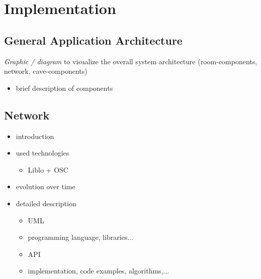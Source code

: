 \documentclass[conference]{acmsiggraph}
\begin{document}
\section{Implementation}





\subsection{General Application Architecture}
\textit{Graphic / diagram} to visualize the overall system architecture (room-components, network, cave-components)
\begin{itemize}
\item brief description of components
\end{itemize}





\subsection{Network}
\begin{itemize}
\item introduction
\item{
	used technologies
	\begin{itemize}
	\item Liblo + OSC
	\end{itemize}
}
\item evolution over time
\item{
	detailed description
	\begin{itemize}
	\item UML
	\item programming language, libraries...
	\item API
	\item implementation, code examples, algorithms,...
	\end{itemize}
}
\end{itemize}





\end{document}
